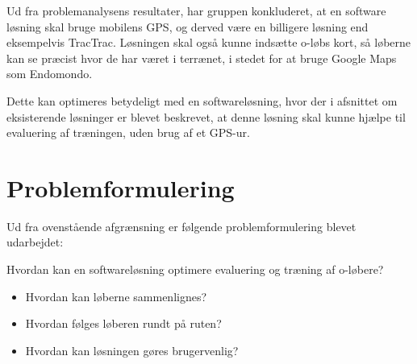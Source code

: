 Ud fra problemanalysens resultater, har gruppen konkluderet, at en software løsning skal bruge mobilens GPS, og derved være en billigere løsning end eksempelvis TracTrac. Løsningen skal også kunne indsætte o-løbs kort, så løberne kan se præcist hvor de har været i terrænet, i stedet for at bruge Google Maps som Endomondo. 

Dette kan optimeres betydeligt med en softwareløsning, hvor der i afsnittet om eksisterende løsninger er blevet beskrevet, at denne løsning skal kunne hjælpe til evaluering af træningen, uden brug af et GPS-ur.

\section{Problemformulering}
Ud fra ovenstående afgrænsning er følgende problemformulering blevet udarbejdet:

Hvordan kan en softwareløsning optimere evaluering og træning af o-løbere?
\begin{itemize}
\item Hvordan kan løberne sammenlignes?
\item Hvordan følges løberen rundt på ruten?
\item Hvordan kan løsningen gøres brugervenlig?
\end{itemize}

